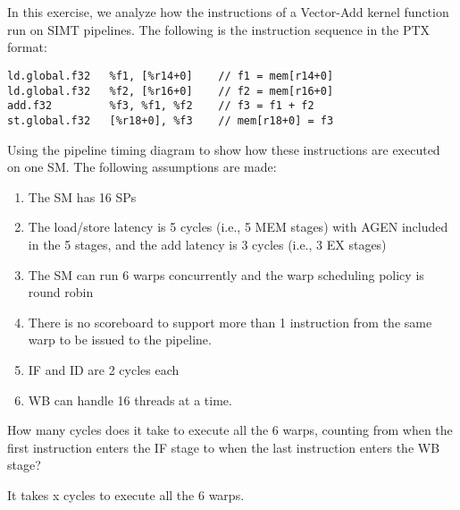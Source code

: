 \documentclass[11pt]{article}
\begin{document}
\section{}

In this exercise, we analyze how the instructions of a Vector-Add kernel function run on SIMT pipelines. The following is the instruction sequence in the PTX format:

\begin{verbatim}
ld.global.f32   %f1, [%r14+0]    // f1 = mem[r14+0]
ld.global.f32   %f2, [%r16+0]    // f2 = mem[r16+0]
add.f32         %f3, %f1, %f2    // f3 = f1 + f2
st.global.f32   [%r18+0], %f3    // mem[r18+0] = f3 
\end{verbatim}

Using the pipeline timing diagram to show how these instructions are executed on one SM. The following assumptions are made: 

\begin{enumerate}
	\item The SM has 16 SPs
	\item The load/store latency is 5 cycles (i.e., 5 MEM stages) with AGEN included in the 5 stages, and the add latency is 3 cycles (i.e., 3 EX stages)
	\item The SM can run 6 warps concurrently and the warp scheduling policy is round robin
	\item There is no scoreboard to support more than 1 instruction from the same warp to be issued to the pipeline. 
	\item IF and ID are 2 cycles each
	\item WB can handle 16 threads at a time.
\end{enumerate}

How many cycles does it take to execute all the 6 warps, counting from when the first instruction enters the IF stage to when the last instruction enters the WB stage?

\begin{Answer}


It takes x cycles to execute all the 6 warps.
\end{Answer}

\newpage
\end{document}
